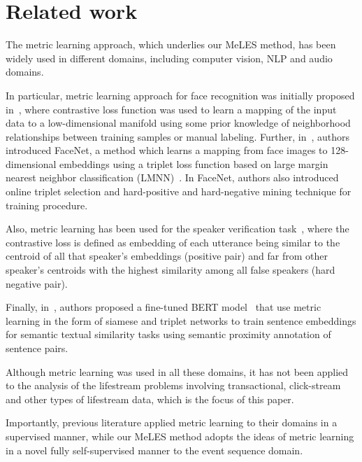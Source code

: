 \documentclass{article}
\begin{document}
\section{Related work} \label{sec-rel-work}

The metric learning approach, which underlies our MeLES method, has been widely used in different domains, including computer vision, NLP and audio domains. 

In particular, metric learning approach for face recognition was initially proposed in~\cite{Chopra2005LearningAS}, where contrastive loss function was used to learn a mapping of the input data to a low-dimensional manifold using some prior knowledge of neighborhood relationships between training samples or manual labeling. Further, in~\cite{Schroff2015FaceNetAU}, authors introduced FaceNet, a method which learns a mapping from face images to 128-dimensional embeddings using a triplet loss function based on large margin nearest neighbor classification (LMNN)~\cite{Weinberger2005DistanceML}. In FaceNet, authors also introduced online triplet selection and hard-positive and hard-negative mining technique for training procedure.


Also, metric learning has been used for the speaker verification task~\cite{Wan2018GeneralizedEL}, where the contrastive loss is defined as embedding of each utterance being similar to the centroid of all that speaker's embeddings (positive pair) and far from other speaker's centroids with the highest similarity among all false speakers (hard negative pair).

Finally, in~\cite{Reimers2019SentenceBERTSE}, authors proposed a fine-tuned BERT model~\cite{Devlin2019BERTPO} that use metric learning in the form of siamese and triplet networks to train sentence embeddings for semantic textual similarity tasks using semantic proximity annotation of sentence pairs.

Although metric learning was used in all these domains, it has not been applied to the analysis of the lifestream problems involving transactional, click-stream and other types of lifestream data, which is the focus of this paper.

Importantly, previous literature applied metric learning to their domains in a supervised manner, while our MeLES method adopts the ideas of metric learning in a novel fully self-supervised manner to the event sequence domain.  
\end{document}
